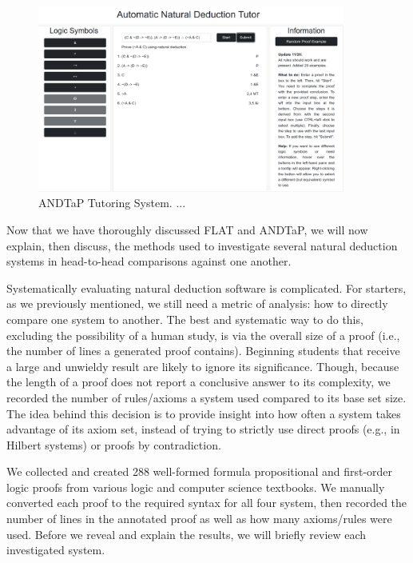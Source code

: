 \documentclass[ms]{uncgdissertationexp2}
\theoremstyle{plain}
\theoremstyle{definition}
\theoremstyle{remark}
\newcommand{\titlecaption}[2]{\caption[#1]{#1. #2}}
\begin{document}
\begin{figure}[h!]
	\centering
	\includegraphics[width=0.9\textwidth]{andtap-tutor.png}
	\titlecaption{ANDTaP Tutoring System}{...}
	\label{fig:andtap}
\end{figure} 

Now that we have thoroughly discussed FLAT and ANDTaP, we will now explain, then discuss, the methods used to investigate several natural deduction systems in head-to-head comparisons against one another.

Systematically evaluating natural deduction software is complicated. For starters, as we previously mentioned, we still need a metric of analysis: how to directly compare one system to another. The best and systematic way to do this, excluding the possibility of a human study, is via the overall size of a proof (i.e., the number of lines a generated proof contains). Beginning students that receive a large and unwieldy result are likely to ignore its significance. Though, because the length of a proof does not report a conclusive answer to its complexity, we recorded the number of rules/axioms a system used compared to its base set size. The idea behind this decision is to provide insight into how often a system takes advantage of its axiom set, instead of trying to strictly use direct proofs (e.g., in Hilbert systems) or proofs by contradiction. 

We collected and created 288 well-formed formula propositional and first-order logic proofs from various logic and computer science textbooks. We manually converted each proof to the required syntax for all four system, then recorded the number of lines in the annotated proof as well as how many axioms/rules were used. Before we reveal and explain the results, we will briefly review each investigated system.
\end{document}
